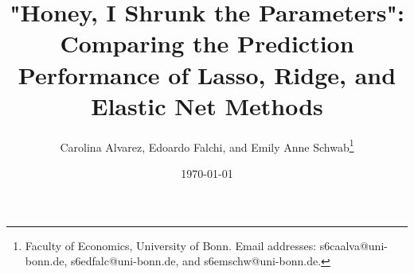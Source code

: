 \title{"Honey, I Shrunk the Parameters": Comparing the Prediction Performance of Lasso,
Ridge, and Elastic Net Methods}

\author{Carolina Alvarez, Edoardo Falchi, and Emily Anne Schwab\thanks{Faculty of Economics, University of Bonn. Email addresses: s6caalva@uni-bonn.de, s6edfalc@uni-bonn.de, and s6emschw@uni-bonn.de.}}

\date{\today}

